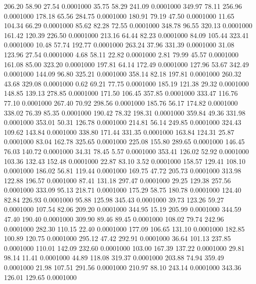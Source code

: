  206.20   58.90   27.54   0.0001000
  35.75   58.29  241.09   0.0001000
 349.97   78.11  256.96   0.0001000
 178.18   65.56  284.75   0.0001000
 180.91   79.19   47.50   0.0001000
  11.65  104.34   66.29   0.0001000
  85.62   82.28   72.55   0.0001000
 348.78   96.55  320.13   0.0001000
 161.42  120.39  226.50   0.0001000
 213.16   64.44   82.23   0.0001000
  84.09  105.44  323.41   0.0001000
  10.48   57.74  192.77   0.0001000
 263.24   37.96  331.39   0.0001000
  31.08  123.96   27.54   0.0001000
   4.68   58.11   22.82   0.0001000
   2.81   79.99   45.57   0.0001000
 161.08   85.00  323.20   0.0001000
 197.81   64.14  172.49   0.0001000
 127.96   53.67  342.49   0.0001000
 144.09   96.80  325.21   0.0001000
 358.14   82.18  197.81   0.0001000
 260.32   43.68  329.08   0.0001000
   0.62   69.21   77.75   0.0001000
 185.19  121.38   29.32   0.0001000
 148.85  139.13  278.85   0.0001000
 171.50  106.45  357.85   0.0001000
 333.47  116.76   77.10   0.0001000
 267.40   70.92  298.56   0.0001000
 185.76   56.17  174.82   0.0001000
 338.02   76.39   85.35   0.0001000
 190.42   78.32  198.31   0.0001000
 359.84   49.36  331.98   0.0001000
 353.01   50.31  126.78   0.0001000
 214.81   56.14  249.85   0.0001000
 324.43  109.62  143.84   0.0001000
 338.80  171.44  331.35   0.0001000
 163.84  124.31   25.87   0.0001000
  83.04  162.78  325.65   0.0001000
 225.08  155.80  289.65   0.0001000
 146.45   76.03  140.72   0.0001000
  34.31   78.45    5.57   0.0001000
 353.41  126.02   52.92   0.0001000
 103.36  132.43  152.48   0.0001000
  22.87   83.10    3.52   0.0001000
 158.57  129.41  108.10   0.0001000
 186.02   56.81  119.44   0.0001000
 169.75   47.72  205.73   0.0001000
 313.98  122.88  196.57   0.0001000
  87.41  131.18  297.47   0.0001000
  29.25  129.38  257.56   0.0001000
 333.09   95.13  218.71   0.0001000
 175.29   58.75  180.78   0.0001000
 124.40   82.84  226.93   0.0001000
  95.88  125.98  345.43   0.0001000
  39.73  123.26   59.27   0.0001000
 107.54   82.06  209.20   0.0001000
 344.95   15.19  205.99   0.0001000
 344.59   47.40  190.40   0.0001000
 309.90   89.46   89.45   0.0001000
 108.02   79.74  242.96   0.0001000
 282.30  110.15   22.40   0.0001000
 177.09  106.65  131.10   0.0001000
 182.85  100.89  120.75   0.0001000
 295.12   47.42  292.91   0.0001000
  36.64  101.13  237.85   0.0001000
 110.01  142.09  232.60   0.0001000
 103.00  167.39  137.22   0.0001000
  29.81   98.14   11.41   0.0001000
  44.89  118.08  319.37   0.0001000
 203.88   74.94  359.49   0.0001000
  21.98  107.51  291.56   0.0001000
 210.97   88.10  243.14   0.0001000
 343.36  126.01  129.65   0.0001000
